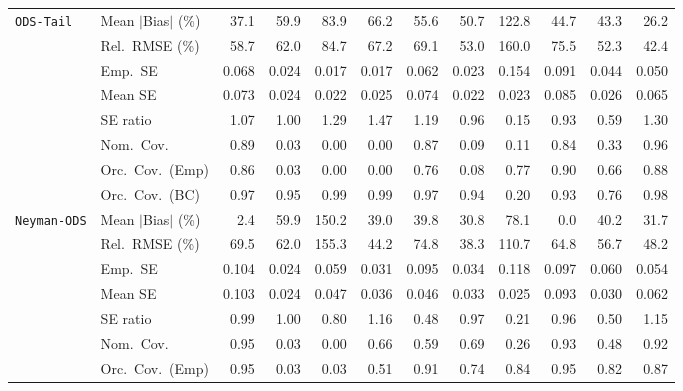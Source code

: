 \begin{landscape}
\begin{longtable}{llrrrrrrrrrr}
\addlinespace[2pt]
\quad \texttt{ODS-Tail} & Mean $|$Bias$|$ (\%) & \cellcolor{ranktwo}37.1 & 59.9 & 83.9 & 66.2 & 55.6 & 50.7 & 122.8 & 44.7 & \cellcolor{rankthree}43.3 & \cellcolor{rankone}26.2 \\
 & Rel.\ RMSE (\%) & 58.7 & 62.0 & 84.7 & 67.2 & 69.1 & \cellcolor{rankthree}53.0 & 160.0 & 75.5 & \cellcolor{ranktwo}52.3 & \cellcolor{rankone}42.4 \\
 & Emp.\ SE & 0.068 & 0.024 & 0.017 & 0.017 & 0.062 & 0.023 & 0.154 & 0.091 & 0.044 & 0.050 \\
 & Mean SE & 0.073 & 0.024 & 0.022 & 0.025 & 0.074 & 0.022 & 0.023 & 0.085 & 0.026 & 0.065 \\
 & SE ratio & \cellcolor{rankthree}1.07 & \cellcolor{rankone}1.00 & 1.29 & 1.47 & 1.19 & \cellcolor{ranktwo}0.96 & 0.15 & \cellcolor{rankthree}0.93 & 0.59 & 1.30 \\
 & Nom.\ Cov. & \cellcolor{ranktwo}0.89 & 0.03 & 0.00 & 0.00 & \cellcolor{rankthree}0.87 & 0.09 & 0.11 & 0.84 & 0.33 & \cellcolor{rankone}0.96 \\
 & Orc.\ Cov.\ (Emp) & \cellcolor{rankthree}0.86 & 0.03 & 0.00 & 0.00 & 0.76 & 0.08 & 0.77 & \cellcolor{rankone}0.90 & 0.66 & \cellcolor{ranktwo}0.88 \\
 & Orc.\ Cov.\ (BC) & \cellcolor{rankthree}0.97 & \cellcolor{rankone}0.95 & 0.99 & 0.99 & \cellcolor{rankthree}0.97 & \cellcolor{ranktwo}0.94 & 0.20 & \cellcolor{rankthree}0.93 & 0.76 & 0.98 \\
\addlinespace[2pt]
\quad \texttt{Neyman-ODS} & Mean $|$Bias$|$ (\%) & \cellcolor{ranktwo}2.4 & 59.9 & 150.2 & 39.0 & 39.8 & \cellcolor{rankthree}30.8 & 78.1 & \cellcolor{rankone}0.0 & 40.2 & 31.7 \\
 & Rel.\ RMSE (\%) & 69.5 & 62.0 & 155.3 & \cellcolor{ranktwo}44.2 & 74.8 & \cellcolor{rankone}38.3 & 110.7 & 64.8 & 56.7 & \cellcolor{rankthree}48.2 \\
 & Emp.\ SE & 0.104 & 0.024 & 0.059 & 0.031 & 0.095 & 0.034 & 0.118 & 0.097 & 0.060 & 0.054 \\
 & Mean SE & 0.103 & 0.024 & 0.047 & 0.036 & 0.046 & 0.033 & 0.025 & 0.093 & 0.030 & 0.062 \\
 & SE ratio & \cellcolor{ranktwo}0.99 & \cellcolor{rankone}1.00 & 0.80 & 1.16 & 0.48 & \cellcolor{rankthree}0.97 & 0.21 & 0.96 & 0.50 & 1.15 \\
 & Nom.\ Cov. & \cellcolor{rankone}0.95 & 0.03 & 0.00 & 0.66 & 0.59 & 0.69 & 0.26 & \cellcolor{ranktwo}0.93 & 0.48 & \cellcolor{rankthree}0.92 \\
 & Orc.\ Cov.\ (Emp) & \cellcolor{rankone}0.95 & 0.03 & 0.03 & 0.51 & \cellcolor{ranktwo}0.91 & 0.74 & 0.84 & \cellcolor{rankone}0.95 & 0.82 & \cellcolor{rankthree}0.87 \\

\end{longtable}
\end{landscape}
